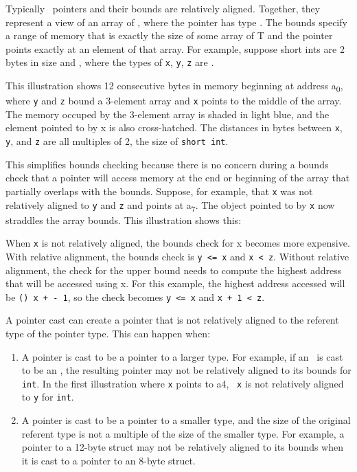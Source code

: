 Typically \arrayptr\ pointers and their bounds are relatively
aligned. Together, they represent a view of an array of , where
the pointer has type
\arrayptrT. The
bounds specify a range of memory that is exactly the size of some array
of T and the pointer points exactly at an element of that array. For
example, suppose short ints are 2 bytes in size and 
{\texttt{}}, where the types of \texttt{x},
\texttt{y}, \texttt{z} are  .

This illustration shows 12 consecutive bytes in memory beginning at
address a\textsubscript{0}, where \texttt{y} and \texttt{z} bound a
3-element array and \texttt{x} points to the middle of the array. The
memory occuped by the 3-element array is shaded in light blue, and the
element pointed to by x is also cross-hatched. The distances in bytes
between \texttt{x}, \texttt{y}, and \texttt{z} are all multiples of 2,
the size of \texttt{short int}.
\begin{center}
\end{center}

This simplifies bounds checking because there is no concern during a
bounds check that a pointer will access memory at the end or beginning
of the array that partially overlaps with the bounds. Suppose, for
example, that \texttt{x} was not relatively aligned to \texttt{y} and
\texttt{z} and points at a\textsubscript{7}. The object pointed to by
\texttt{x} now straddles the array bounds. This illustration shows this:
\begin{center}
\end{center}

When \texttt{x} is not relatively aligned, the bounds check for x
becomes more expensive. With relative alignment, the bounds check is
\texttt{y <= x} and \texttt{x < z}. Without relative
alignment, the check for the upper bound needs to compute the highest
address that will be accessed using x. For this example, the highest
address accessed will be
\texttt{(\arrayptrchar) x +  - 1}, so the check becomes 
\texttt{y <= x} and \texttt{x + 1 < z}.

A pointer cast can create a pointer that is not relatively aligned to
the referent type of the pointer type. This can happen when:

\begin{enumerate}
\item
  A pointer is cast to be a pointer to a larger type. For example, if an
  \ is cast to be an
  \arrayptrint , the resulting pointer
  may not be relatively aligned to its bounds for \texttt{int}. In the
  first illustration where \texttt{x} points to a4,
  \arrayptrint\ \texttt{x} is not relatively
  aligned to \texttt{y} for \texttt{int}.
\item
  A pointer is cast to be a pointer to a smaller type, and the size of
  the original referent type is not a multiple of the size of the
  smaller type. For example, a pointer to a 12-byte struct may not be
  relatively aligned to its bounds when it is cast to a pointer to an
  8-byte struct.
\end{enumerate}

